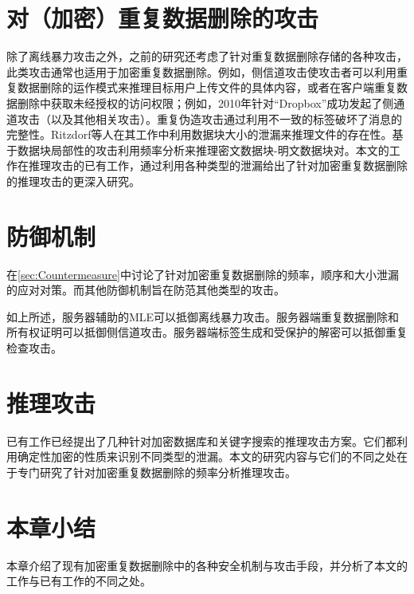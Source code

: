 \section{对（加密）重复数据删除的攻击} 

除了离线暴力攻击之外，之前的研究还考虑了针对重复数据删除存储的各种攻击，此类攻击通常也适用于加密重复数据删除。例如，侧信道攻击使攻击者可以利用重复数据删除的运作模式来推理目标用户上传文件的具体内容，或者在客户端重复数据删除中获取未经授权的访问权限；例如，2010年针对“Dropbox”成功发起了侧通道攻击（以及其他相关攻击）。重复伪造攻击通过利用不一致的标签破坏了消息的完整性。Ritzdorf等人在其工作中利用数据块大小的泄漏来推理文件的存在性。基于数据块局部性的攻击利用频率分析来推理密文数据块-明文数据块对。本文的工作在推理攻击的已有工作，通过利用各种类型的泄漏给出了针对加密重复数据删除的推理攻击的更深入研究。
   
\section{防御机制} 

 在\ref{sec:Countermeasure}中讨论了针对加密重复数据删除的频率，顺序和大小泄漏的应对对策。而其他防御机制旨在防范其他类型的攻击。
 
如上所述，服务器辅助的MLE可以抵御离线暴力攻击。服务器端重复数据删除和所有权证明可以抵御侧信道攻击。服务器端标签生成和受保护的解密可以抵御重复检查攻击。


\section{推理攻击}  

已有工作已经提出了几种针对加密数据库和关键字搜索的推理攻击方案。它们都利用确定性加密的性质来识别不同类型的泄漏。本文的研究内容与它们的不同之处在于专门研究了针对加密重复数据删除的频率分析推理攻击。

\section{本章小结}
本章介绍了现有加密重复数据删除中的各种安全机制与攻击手段，并分析了本文的工作与已有工作的不同之处。